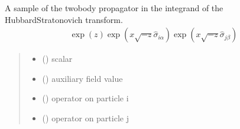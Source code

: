 \documentclass[letterpaper,10pt,english]{sphinxmanual}
\begin{document}
\begin{fulllineitems}
\begin{fulllineitems}
\label{\detokenize{spinbox:spinbox.core.HilbertPropagatorHS.twobody_sample}}
\pysigstartsignatures
{}
\pysigstopsignatures
\sphinxAtStartPar
A sample of the two\sphinxhyphen{}body propagator in the integrand of the Hubbard\sphinxhyphen{}Stratonovich transform.
\begin{equation*}
\begin{split}\exp(z) \exp ({x \sqrt{-z} \hat{\sigma}_{i \alpha} }) \exp({x \sqrt{-z} \hat{\sigma}_{j \beta} } )\end{split}
\end{equation*}\begin{quote}\begin{description}
\begin{itemize}
\item {} 
\sphinxAtStartPar
{} () \textendash{} scalar

\item {} 
\sphinxAtStartPar
{} () \textendash{} auxiliary field value

\item {} 
\sphinxAtStartPar
{} ({\hyperref[\detokenize{spinbox:spinbox.core.HilbertOperator}]{}}) \textendash{} operator on particle i

\item {} 
\sphinxAtStartPar
{} ({\hyperref[\detokenize{spinbox:spinbox.core.HilbertOperator}]{}}) \textendash{} operator on particle j


\end{itemize}
\end{description}
\end{quote}
\end{fulllineitems}
\end{fulllineitems}
\end{document}

